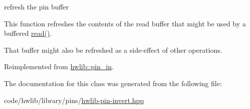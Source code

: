 refresh the pin buffer

This function refreshes the contents of the read buffer that might be used by a buffered \hyperlink{classhwlib_1_1pin__invert__from__in__t_a41050e62292c67a287bbd9fbce004b45}{read()}.

That buffer might also be refreshed as a side-\/effect of other operations. 

Reimplemented from \hyperlink{classhwlib_1_1pin__in_a3fb1bfb1ec962bb6d31a5e865f0d0acb}{hwlib\+::pin\+\_\+in}.



The documentation for this class was generated from the following file\+:\begin{DoxyCompactItemize}
\item 
code/hwlib/library/pins/\hyperlink{hwlib-pin-invert_8hpp}{hwlib-\/pin-\/invert.\+hpp}\end{DoxyCompactItemize}
